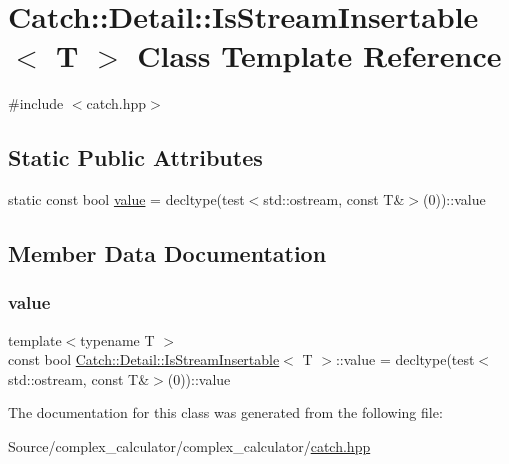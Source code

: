 \hypertarget{class_catch_1_1_detail_1_1_is_stream_insertable}{}\section{Catch\+:\+:Detail\+:\+:Is\+Stream\+Insertable$<$ T $>$ Class Template Reference}
\label{class_catch_1_1_detail_1_1_is_stream_insertable}


{\ttfamily \#include $<$catch.\+hpp$>$}

\subsection*{Static Public Attributes}
\begin{DoxyCompactItemize}
\item 
static const bool \mbox{\hyperlink{class_catch_1_1_detail_1_1_is_stream_insertable_a42818b09ae5851126a70ee263769e309}{value}} = decltype(test$<$std\+::ostream, const T\&$>$(0))\+::value
\end{DoxyCompactItemize}


\subsection{Member Data Documentation}
\mbox{\label{class_catch_1_1_detail_1_1_is_stream_insertable_a42818b09ae5851126a70ee263769e309}} 
\subsubsection{\texorpdfstring{value}{value}}
{\footnotesize\ttfamily template$<$typename T $>$ \\
const bool \mbox{\hyperlink{class_catch_1_1_detail_1_1_is_stream_insertable}{Catch\+::\+Detail\+::\+Is\+Stream\+Insertable}}$<$ T $>$\+::value = decltype(test$<$std\+::ostream, const T\&$>$(0))\+::value\hspace{0.3cm}{\ttfamily [static]}}



The documentation for this class was generated from the following file\+:\begin{DoxyCompactItemize}
\item 
Source/complex\+\_\+calculator/complex\+\_\+calculator/\mbox{\hyperlink{catch_8hpp}{catch.\+hpp}}\end{DoxyCompactItemize}
